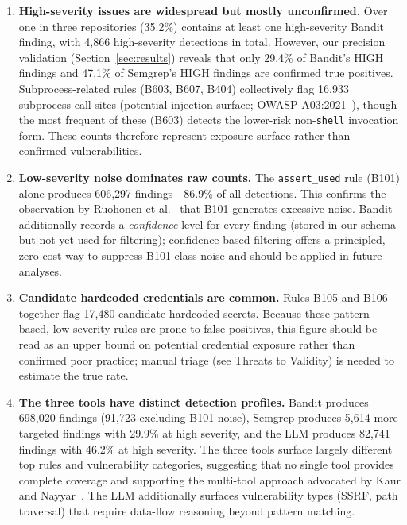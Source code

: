 \documentclass[sigconf,authordraft]{acmart}
\begin{document}
\begin{enumerate}
  \item \textbf{High-severity issues are widespread but mostly
    unconfirmed.} Over one in three repositories (35.2\%) contains at
    least one high-severity Bandit finding, with 4{,}866 high-severity
    detections in total. However, our precision validation
    (Section~\ref{sec:results}) reveals that only 29.4\% of Bandit's
    HIGH findings and 47.1\% of Semgrep's HIGH findings are confirmed
    true positives. Subprocess-related rules (B603, B607, B404)
    collectively flag 16{,}933 subprocess call sites (potential
    injection surface; OWASP A03:2021~\cite{OWASP2021}), though the
    most frequent of these (B603) detects the lower-risk
    non-\texttt{shell} invocation form. These counts therefore
    represent exposure surface rather than confirmed vulnerabilities.

  \item \textbf{Low-severity noise dominates raw counts.} The
    \texttt{assert\_used} rule (B101) alone produces 606{,}297
    findings---86.9\% of all detections. This confirms the observation
    by Ruohonen et al.~\cite{Ruohonen2021} that B101 generates
    excessive noise. Bandit additionally records a \emph{confidence}
    level for every finding (stored in our schema but not yet used for
    filtering); confidence-based filtering offers a principled,
    zero-cost way to suppress B101-class noise and should be applied in
    future analyses.

  \item \textbf{Candidate hardcoded credentials are common.} Rules
    B105 and B106 together flag 17{,}480 candidate hardcoded secrets.
    Because these pattern-based, low-severity rules are prone to false
    positives, this figure should be read as an upper bound on
    potential credential exposure rather than confirmed poor practice;
    manual triage (see Threats to Validity) is needed to estimate the
    true rate.

  \item \textbf{The three tools have distinct detection profiles.}
    Bandit produces 698{,}020 findings (91{,}723 excluding B101 noise),
    Semgrep produces 5{,}614 more targeted findings with 29.9\%
    at high severity, and the LLM produces 82{,}741 findings with
    46.2\% at high severity. The three tools surface largely different
    top rules and vulnerability categories, suggesting that no single
    tool provides complete coverage and supporting the multi-tool
    approach advocated by Kaur and Nayyar~\cite{Kaur2020}. The LLM
    additionally surfaces vulnerability types (SSRF, path traversal)
    that require data-flow reasoning beyond pattern matching.


\end{enumerate}
\end{document}
